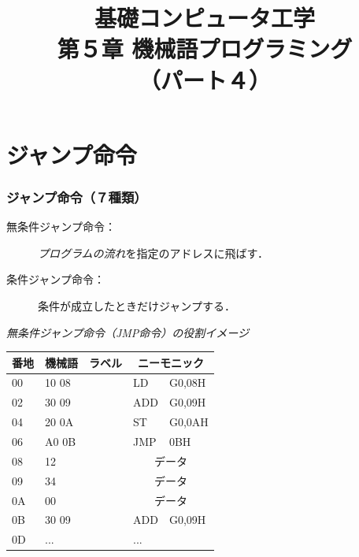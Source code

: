 \documentclass{beamer}                 %
\begin{document}
\title{基礎コンピュータ工学\\第５章 機械語プログラミング\\（パート４）}
\date{}

\begin{frame}
  \titlepage
\end{frame}


\section{ジャンプ命令}
\begin{frame}
  \frametitle{ジャンプ命令（７種類）}
  \begin{description}
  \item[無条件ジャンプ命令：]\emph{プログラムの流れ}を指定のアドレスに飛ばす．
  \item[条件ジャンプ命令：]条件が成立したときだけジャンプする．
  \end{description}
  \vfill

  \emph{無条件ジャンプ命令（JMP命令）の役割イメージ}\\
  {\ttfamily\small\begin{center}
    \begin{tabular}{|l|l|l|l l|} \hline
      番地 & 機械語 & ラベル & \multicolumn{2}{|c|}{ニーモニック} \\
      \hline
      00 & 10 08 &             & LD   & G0,08H                \\
      02 & 30 09 &             & ADD  & G0,09H                \\
      04 & 20 0A &             & ST   & G0,0AH                \\
      06 & A0 0B &             & JMP  & 0BH                   \\
      08 & 12    &             & \multicolumn{2}{|c|}{データ} \\
      09 & 34    &             & \multicolumn{2}{|c|}{データ} \\
      0A & 00    &             & \multicolumn{2}{|c|}{データ} \\
      0B & 30 09 &             & ADD  & G0,09H                \\
      0D & ...   &             & ...  &                       \\
      \hline
    \end{tabular}
    \end{center}}
  \vfill
\end{frame}
\end{document}
